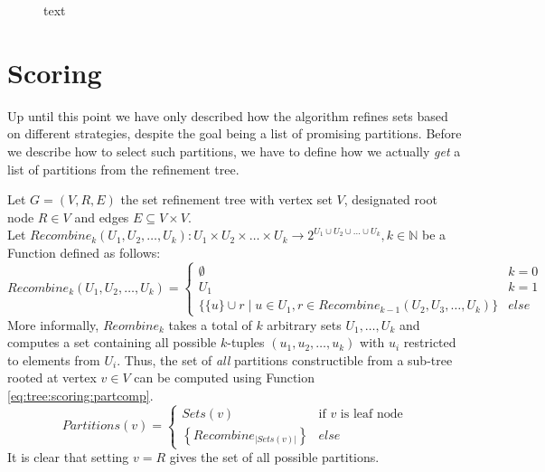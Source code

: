 				\begin{figure}[ht!]
					\centering
					
					\caption{text}
					\label{fig:tree:cutoff:mos}
				\end{figure}
		
	\clearpage
	
	\section{Scoring}
	\label{chap:gcg:scoring}
	
		Up until this point we have only described how the algorithm refines sets based on different strategies, despite the goal being a list of promising partitions.
		Before we describe how to select such partitions, we have to define how we actually \textit{get} a list of partitions from the refinement tree.
		
		Let $G = (V, R, E)$ the set refinement tree with vertex set $V$, designated root node $R \in V$ and edges $E \subseteq V \times V$. \\
		Let $Recombine_k(U_1, U_2, \ldots, U_k): U_1 \times U_2 \times \ldots \times U_k \xrightarrow{} 2^{U_1 \cup U_2 \cup \ldots \cup U_k}, k \in \mathbb{N}$ be a Function defined as follows:
		\begin{equation*}
			Recombine_k(U_1, U_2, \ldots, U_k) = \begin{cases}
				\emptyset & k = 0 \\
				U_1 & k = 1 \\
				\{ \{ u \} \cup r \mid u \in U_1, r \in Recombine_{k-1}(U_2, U_3, \ldots, U_k) \} & else
			\end{cases}
		\end{equation*}
		More informally, $Reombine_k$ takes a total of $k$ arbitrary sets $U_1, \ldots, U_k$ and computes a set containing all possible $k$-tuples $(u_1, u_2, \ldots, u_k)$ with $u_i$ restricted to elements from $U_i$.
		Thus, the set of \textit{all} partitions constructible from a sub-tree rooted at vertex $v \in V$ can be computed using Function \ref{eq:tree:scoring:partcomp}.
		\begin{equation}
		\label{eq:tree:scoring:partcomp}
			Partitions(v) = \begin{cases}
				Sets(v) & \text{if $v$ is leaf node} \\
				\left\{ Recombine_{|Sets(v)|} \right\} & else
			\end{cases}
		\end{equation}
		It is clear that setting $v = R$ gives the set of all possible partitions.
		
